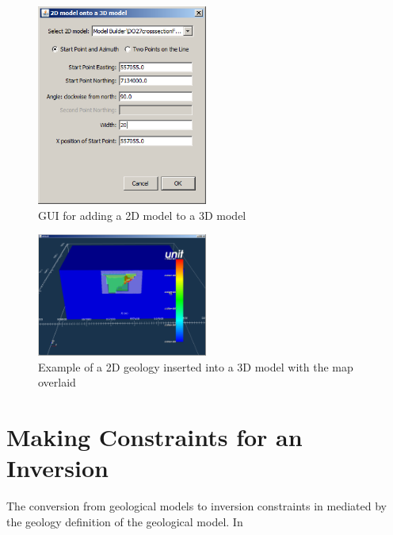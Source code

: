 \begin{figure} [h]
    \centering
    \includegraphics[width=0.5\textwidth]{images/GUI/add2Dto3D.PNG}
    \caption{GUI for adding a 2D model to a 3D model}
    \label{fig:add2Dto3D}
\end{figure}

\begin{figure} [h]
    \centering
    \includegraphics[width=0.5\textwidth]{images/GUI/mapModelCross3D.PNG}
    \caption{Example of a 2D geology inserted into a 3D model with the map overlaid}
    \label{fig:mapModelCross3D}
\end{figure}

\section{Making Constraints for an Inversion}
\label{sec:Making Constraints for and Inversion}

The conversion from geological models to inversion constraints in mediated by the geology definition of the geological model. In 

%

\endinput

 Interestingly, the assumption that all magnetizations are in the same direction also assumes that all Koenigsberger ratios are equal.

Any text after an \endinput is ignored.
You could put scraps here or things in progress.
